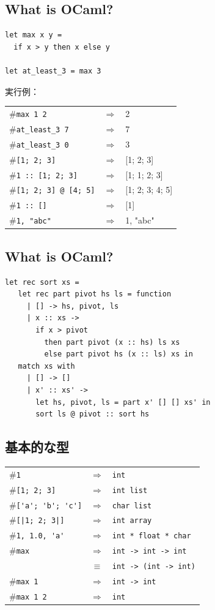 \documentclass[papersize,30pt,slide]{jsarticle}
\begin{document}
\newpage
\subsection{What is OCaml?}
\begin{lstlisting}
let max x y =
  if x > y then x else y

let at_least_3 = max 3
\end{lstlisting}
{
実行例：
\begin{tabular}{lcl}
\#\lstinline|max 1 2| &$\Longrightarrow$& 2\\
\#\lstinline|at_least_3 7| &$\Longrightarrow$& 7\\
\#\lstinline|at_least_3 0| &$\Longrightarrow$& 3\\
\#\lstinline|[1; 2; 3]| &$\Longrightarrow$& [1; 2; 3]\\
\#\lstinline|1 :: [1; 2; 3]| &$\Longrightarrow$& [1; 1; 2; 3]\\
\#\lstinline|[1; 2; 3] @ [4; 5]| &$\Longrightarrow$& [1; 2; 3; 4; 5]\\
\#\lstinline|1 :: []| &$\Longrightarrow$& [1]\\
\#\lstinline|1, "abc"| &$\Longrightarrow$& 1, "abc"\\
\end{tabular}

\newpage
}
\subsection*{\thesubsection\quad What is OCaml?}
\begin{lstlisting}
let rec sort xs =
   let rec part pivot hs ls = function
     | [] -> hs, pivot, ls
     | x :: xs ->
       if x > pivot
         then part pivot (x :: hs) ls xs
         else part pivot hs (x :: ls) xs in
   match xs with
     | [] -> []
     | x' :: xs' ->
       let hs, pivot, ls = part x' [] [] xs' in
       sort ls @ pivot :: sort hs
\end{lstlisting}


\newpage
\subsection{基本的な型}
\begin{tabular}{lcl}
\#\lstinline|1| &$\Longrightarrow$& \lstinline|int|\\
\#\lstinline|[1; 2; 3]| &$\Longrightarrow$& \lstinline|int list|\\
\#\lstinline|['a'; 'b'; 'c']| &$\Longrightarrow$& \lstinline|char list|\\
\#\lstinline![|1; 2; 3|]! &$\Longrightarrow$& \lstinline|int array|\\
\#\lstinline|1, 1.0, 'a'| &$\Longrightarrow$& \lstinline|int * float * char| \\
\#\lstinline|max| &$\Longrightarrow$& \lstinline|int -> int -> int|\\
                &$\equiv$& \lstinline|int -> (int -> int)| \\
\#\lstinline|max 1| &$\Longrightarrow$& \lstinline|int -> int|\\
\#\lstinline|max 1 2| &$\Longrightarrow$& \lstinline|int|\\
\end{tabular}
\end{document}
